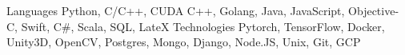
\begin{cvskills}
  \cvskill
    {Languages} %
    {Python, C/C++, CUDA C++, Golang, Java, JavaScript, Objective-C, Swift, C\#, Scala, SQL, LateX} %
  \cvskill
    {Technologies} %
    {Pytorch, TensorFlow, Docker, Unity3D, OpenCV, Postgres, Mongo, Django, Node.JS, Unix, Git, GCP} %
\end{cvskills}
